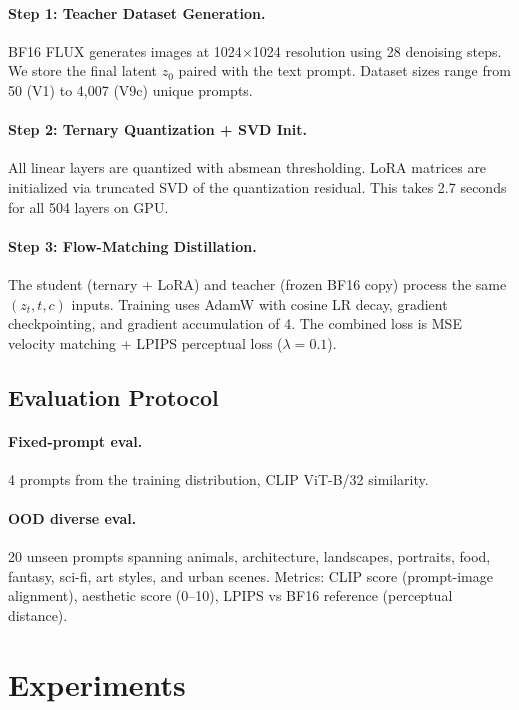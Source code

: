 \documentclass[10pt,twocolumn]{article}
\begin{document}
\paragraph{Step 1: Teacher Dataset Generation.}
BF16 FLUX generates images at 1024$\times$1024 resolution using 28 denoising steps.
We store the final latent $z_0$ paired with the text prompt.
Dataset sizes range from 50 (V1) to 4{,}007 (V9c) unique prompts.

\paragraph{Step 2: Ternary Quantization + SVD Init.}
All linear layers are quantized with absmean thresholding.
LoRA matrices are initialized via truncated SVD of the quantization residual.
This takes 2.7 seconds for all 504 layers on GPU.

\paragraph{Step 3: Flow-Matching Distillation.}
The student (ternary + LoRA) and teacher (frozen BF16 copy) process the same $(z_t, t, c)$ inputs.
Training uses AdamW with cosine LR decay, gradient checkpointing, and gradient accumulation of 4.
The combined loss is MSE velocity matching + LPIPS perceptual loss ($\lambda=0.1$).

\subsection{Evaluation Protocol}

\paragraph{Fixed-prompt eval.} 4 prompts from the training distribution, CLIP ViT-B/32 similarity.

\paragraph{OOD diverse eval.} 20 unseen prompts spanning animals, architecture, landscapes, portraits, food, fantasy, sci-fi, art styles, and urban scenes.
Metrics: CLIP score (prompt-image alignment), aesthetic score (0--10), LPIPS vs BF16 reference (perceptual distance).

\section{Experiments}
\end{document}
